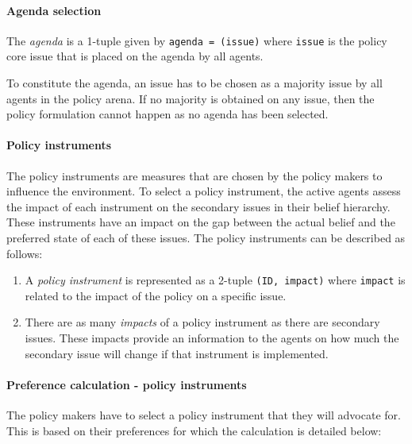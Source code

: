 \documentclass[11pt]{article}
\begin{document}
\paragraph{Agenda selection}

The \emph{agenda} is a 1-tuple given by \texttt{agenda = (issue)} where \texttt{issue} is the policy core issue that is placed on the agenda by all agents.

To constitute the agenda, an issue has to be chosen as a majority issue by all agents in the policy arena. If no majority is obtained on any issue, then the policy formulation cannot happen as no agenda has been selected.


\paragraph{Policy instruments}

The policy instruments are measures that are chosen by the policy makers to influence the environment. To select a policy instrument, the active agents assess the impact of each instrument on the secondary issues in their belief hierarchy. These instruments have an impact on the gap between the actual belief and the preferred state of each of these issues. The policy instruments can be described as follows:

\begin{enumerate}
\item A \emph{policy instrument} is represented as a 2-tuple \texttt{(ID, impact)} where \texttt{impact} is related to the impact of the policy on a specific issue.

\item There are as many \emph{impacts} of a policy instrument as there are secondary issues. These impacts provide an information to the agents on how much the secondary issue will change if that instrument is implemented.

\end{enumerate}


\paragraph{Preference calculation - policy instruments}

The policy makers have to select a policy instrument that they will advocate for. This is based on their preferences for which the calculation is detailed below:
\end{document}
